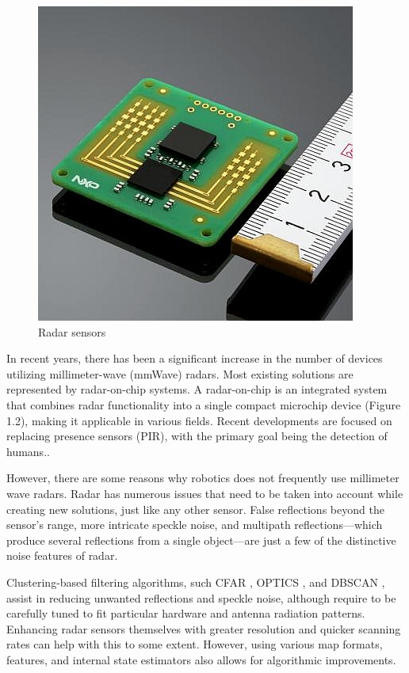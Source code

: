 \begin{figure}[H]
    \centering
    \includegraphics[width=\linewidth/2]{Src/images/automotive-radars.jpg} 
    \caption{Radar sensors \citep{tusur_radar_sensors}}
    \label{fig:radarsensor}
\end{figure}
In recent years, there has been a significant increase in the number of devices utilizing millimeter-wave (mmWave) radars. Most existing solutions are represented by radar-on-chip systems. A radar-on-chip is an integrated system that combines radar functionality into a single compact microchip device (Figure 1.2), making it applicable in various fields. Recent developments are focused on replacing presence sensors (PIR), with the primary goal being the detection of humans.\citep{s24113660}.

However, there are some reasons why robotics does not frequently use millimeter wave radars. Radar has numerous issues that need to be taken into account while creating new solutions, just like any other sensor. False reflections beyond the sensor's range, more intricate speckle noise, and multipath reflections—which produce several reflections from a single object—are just a few of the distinctive noise features of radar. 

Clustering-based filtering algorithms, such CFAR \citep{finn1968adaptive}, OPTICS \citep{nitzberg1972cfar}, and DBSCAN \citep{ankerst1999optics}, assist in reducing unwanted reflections and speckle noise, although require to be carefully tuned to fit particular hardware and antenna radiation patterns. Enhancing radar sensors themselves with greater resolution and quicker scanning rates can help with this to some extent. However, using various map formats, features, and internal state estimators also allows for algorithmic improvements.

